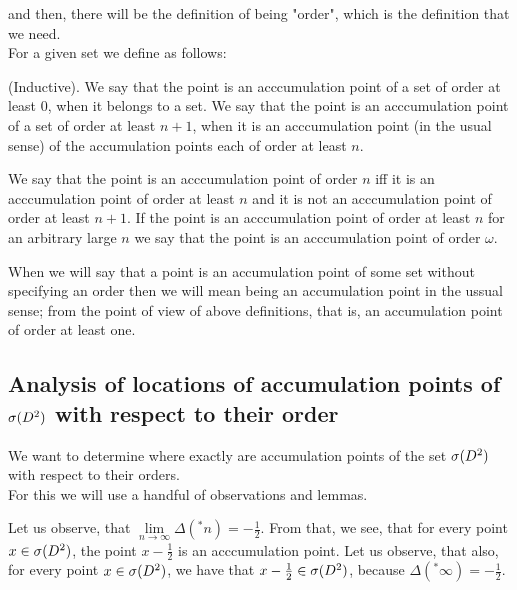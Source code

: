 and then, there will be the definition of being "order", which is the definition that we need. \\
For a given set we define as follows:
\begin{definition}
(Inductive). 
We say that the point is an acccumulation point of a set 
of order at least $0$, when it belongs to a set. 
We say that the point is an acccumulation point of a set 
of order at least $n + 1$, when it is 
an acccumulation point (in the usual sense) of the accumulation points each of order at least $n$. 
\end{definition}  
\begin{definition}
We say that the point is an acccumulation point of order $n$ iff it is an acccumulation point 
of order at least $n$ and it is not an acccumulation point of order at least $n+1$. 
If the point is an acccumulation point of order at least $n$ for an arbitrary large 
$n$ we say that 
the point is an acccumulation point of order $\omega$.
\end{definition}
When we will say that a point is an accumulation point of some set without specifying an order 
then we will mean being an accumulation point in the ussual sense; from the point of view 
of above definitions, that is, an accumulation point of order at least one.
\subsection{Analysis of locations of accumulation points of ${{\sigma}(D^2)}$ with respect to their order}
We want to determine where exactly are accumulation points of the set ${{\sigma}(D^2)}$ with 
respect to their orders. \\
For this we will use  
a handful of observations and lemmas. 
\begin{observation}\label{accumulation_points_are_in_the_spectrum}
Let us observe, that $\lim\limits_{n \to \infty} \Delta(^\ast n) = -\frac{1}{2}$. From that, 
we see, 
that for every point $x \in {{\sigma}(D^2)}$, the point $x - \frac{1}{2}$ is an acccumulation point. 
Let us observe, that also, for every point $x \in {{\sigma}(D^2)}$, we have that $x - \frac{1}{2} 
\in {{\sigma}(D^2)}$, 
because $\Delta(^\ast \infty) = -\frac{1}{2}$. 
\end{observation}

